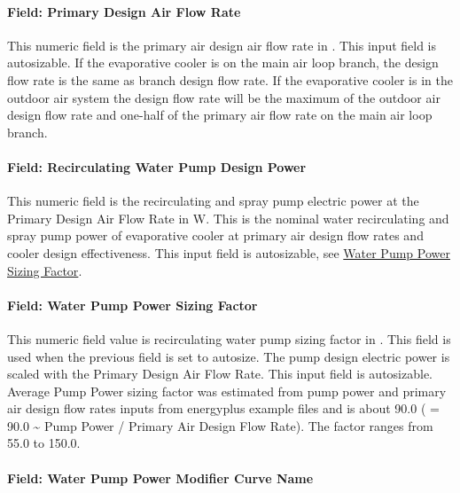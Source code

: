 \paragraph{Field: Primary Design Air Flow Rate}\label{field-primary-design-air-flow-rate}

This numeric field is the primary air design air flow rate in \si{\volumeFlowRate}. This input field is autosizable. If the evaporative cooler is on the main air loop branch, the design flow rate is the same as branch design flow rate. If the evaporative cooler is in the outdoor air system the design flow rate will be the maximum of the outdoor air design flow rate and one-half of the primary air flow rate on the main air loop branch.

\paragraph{Field: Recirculating Water Pump Design Power}\label{field-recirculating-water-pump-design-power}

This numeric field is the recirculating and spray pump electric power at the Primary Design Air Flow Rate in \si{\watt}.
This is the nominal water recirculating and spray pump power of evaporative cooler at primary air design flow rates and cooler design effectiveness.
This input field is autosizable, see \hyperref[field-water-pump-power-sizing-factor]{Water Pump Power Sizing Factor}.

\paragraph{Field: Water Pump Power Sizing Factor}\label{field-water-pump-power-sizing-factor}

This numeric field value is recirculating water pump sizing factor in \si{\wattperVolumeFlowRate}.
This field is used when the previous field is set to autosize. The pump design electric power is scaled with the Primary Design Air Flow Rate. This input field is autosizable.
Average Pump Power sizing factor was estimated from pump power and primary air design flow rates inputs from energyplus example files and
is about \SI{90.0}{\wattperVolumeFlowRate} ( = 90.0 \textasciitilde{} Pump Power / Primary Air Design Flow Rate). The factor ranges from 55.0 to \SI{150.0}{\wattperVolumeFlowRate}.

\paragraph{Field: Water Pump Power Modifier Curve Name}\label{field-water-pump-power-modifier-curve-name}


